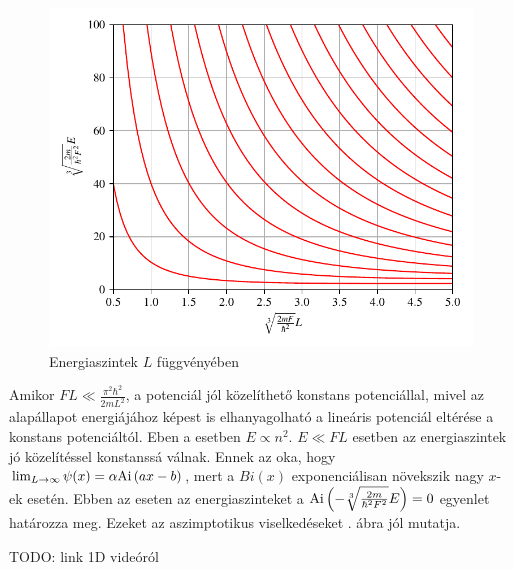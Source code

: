 	\begin{figure}[H]
		\includegraphics[scale=1]{./figs/energiaszintek.pdf}
		\caption{Energiaszintek $L$ függvényében}
		\label{box_energiaszintek_abra}
	\end{figure}
	Amikor $FL \ll \frac{\pi^2\hbar^2}{2mL^2}$, a potenciál jól közelíthető konstans potenciállal, mivel az alapállapot energiájához képest is elhanyagolható a lineáris potenciál eltérése a konstans potenciáltól. Eben a esetben $E \propto n^2$. $E \ll FL$ esetben az energiaszintek jó közelítéssel konstanssá válnak. Ennek az oka, hogy $\lim_{L \to \infty}\psi(x) = \alpha \mathrm{Ai}\left(ax-b\right)$, mert a $Bi(x)$ exponenciálisan növekszik nagy $x$-ek esetén. Ebben az eseten az energiaszinteket a $\mathrm{Ai}\left(- \sqrt[3]{\frac{2m}{\hbar^2F^2}}E\right) = 0$ egyenlet határozza meg. Ezeket az aszimptotikus viselkedéseket . ábra jól mutatja.
    
    TODO: link 1D videóról

